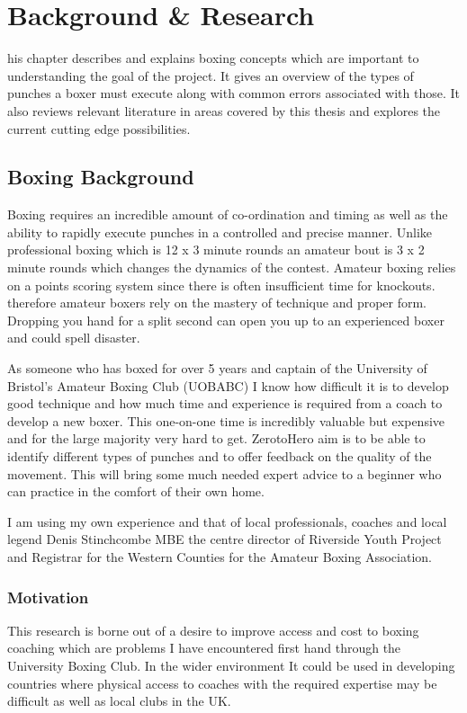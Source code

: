 %
%
\let\textcircled=\pgftextcircled
\chapter{Background \& Research}
\label{chap:intro}

his chapter describes and explains boxing concepts which are important to understanding the goal of the project. It gives an overview of the types of punches a boxer must execute along with common errors associated with those. It also reviews relevant literature in areas covered by this thesis and explores the current cutting edge possibilities.

\section{Boxing Background}
\label{sec:sec01}

Boxing requires an incredible amount of co-ordination and timing as well as the ability to rapidly execute punches in a controlled and precise manner. Unlike professional boxing which is 12 x 3 minute rounds an amateur bout is 3 x 2 minute rounds which changes the dynamics of the contest. Amateur boxing relies on a points scoring system since there is often insufficient time for knockouts. therefore amateur boxers rely on the mastery of technique and proper form. Dropping you hand for a split second can open you up to an experienced boxer and could spell disaster.

As someone who has boxed for over 5 years and captain of the University of Bristol's Amateur Boxing Club (UOBABC) I know how difficult it is to develop good technique and how much time and experience is required from a coach to develop a new boxer. This one-on-one time is incredibly valuable but expensive and for the large majority very hard to get. ZerotoHero aim is to be able to identify different types of punches and to offer feedback on the quality of the movement. This will bring some much needed expert advice to a beginner who can practice in the comfort of their own home.

I am using my own experience and that of local professionals, coaches and local legend Denis Stinchcombe MBE the centre director of Riverside Youth Project and Registrar for the Western Counties for the Amateur Boxing Association.
 

\subsection{Motivation}
\label{subsec:subsec01}
This research is borne out of a desire to improve access and cost to boxing coaching which are problems I have encountered first hand through the University Boxing Club. In the wider environment It could be used in developing countries where physical access to coaches with the required expertise may be difficult as well as local clubs in the UK.

